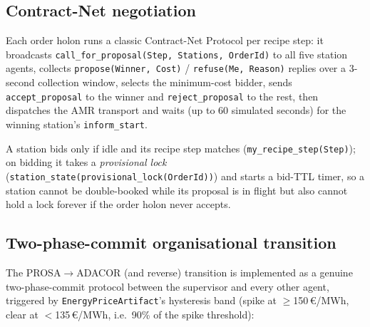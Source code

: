 \documentclass[twocolumn,10pt,a4paper]{article}
\newcommand{\code}[1]{\texttt{\small #1}}
\begin{document}
\subsection{Contract-Net negotiation}
\label{sec:cnp}
Each order holon runs a classic Contract-Net Protocol per recipe step: it broadcasts \code{call\_for\_proposal(Step, Stations, OrderId)} to all five station agents, collects \code{propose(Winner, Cost)} / \code{refuse(Me, Reason)} replies over a 3-second collection window, selects the minimum-cost bidder, sends \code{accept\_proposal} to the winner and \code{reject\_proposal} to the rest, then dispatches the AMR transport and waits (up to 60 simulated seconds) for the winning station's \code{inform\_start}.

A station bids only if idle and its recipe step matches (\code{my\_recipe\_step(Step)}); on bidding it takes a \emph{provisional lock} (\code{station\_state(provisional\_lock(OrderId))}) and starts a bid-TTL timer, so a station cannot be double-booked while its proposal is in flight but also cannot hold a lock forever if the order holon never accepts.

\subsection{Two-phase-commit organisational transition}
\label{sec:2pc}
The PROSA$\to$ADACOR (and reverse) transition is implemented as a genuine two-phase-commit protocol between the supervisor and every other agent, triggered by \code{EnergyPriceArtifact}'s hysteresis band (spike at $\geq$150\,€/MWh, clear at $<$135\,€/MWh, i.e.\ 90\% of the spike threshold):
\end{document}
